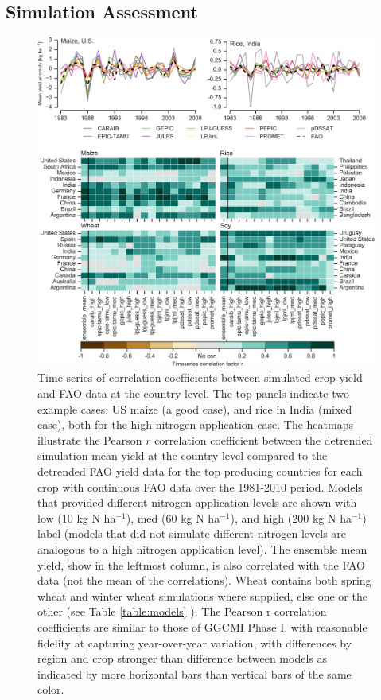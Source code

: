 \documentclass[gmd, manuscript]{copernicus} %
\begin{document}
\subsection{Simulation Assessment}
\begin{figure}[ht]
    \centering
    \includegraphics[width=14cm]{figures/Agformet_validation.png}
    \caption{Time series of correlation coefficients between simulated crop yield and FAO data \citep{FAOSTAT} at the country level. 
    The top panels indicate two example cases: US maize (a good case), and rice in India (mixed case), both for the high nitrogen application case. 
    The heatmaps illustrate the Pearson $r$ correlation coefficient between the detrended simulation mean yield at the country level compared to the detrended FAO yield data for the top producing countries for each crop with continuous FAO data over the 1981-2010 period. 
    Models that provided different nitrogen application levels are shown with low (10 kg N ha$^{-1}$), med (60 kg N ha$^{-1}$), and high (200 kg N ha$^{-1}$) label (models that did not simulate different nitrogen levels are analogous to a high nitrogen application level). 
    The ensemble mean yield, show in the leftmost column, is also correlated with the FAO data (not the mean of the correlations). 
    Wheat contains both spring wheat and winter wheat simulations where supplied, else one or the other (see Table \ref{table:models} ). 
    The Pearson r correlation coefficients are similar to those of GGCMI Phase I, with reasonable fidelity at capturing year-over-year variation, with differences by region and crop stronger than difference between models as indicated by more horizontal bars than vertical bars of the same color.}
    \label{fig:simulation_val}
\end{figure}
\end{document}
